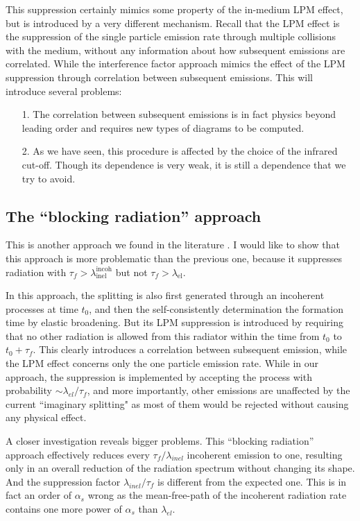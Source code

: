 This suppression certainly mimics some property of the in-medium LPM effect, but is introduced by a very different mechanism.
Recall that the LPM effect is the suppression of the single particle emission rate through multiple collisions with the medium, without any information about how subsequent emissions are correlated. 
While the interference factor approach mimics the effect of the LPM suppression through correlation between subsequent emissions.
This will introduce several problems: 
\begin{itemize}
\item[1.] The correlation between subsequent emissions is in fact physics beyond leading order and requires new types of diagrams to be computed.
\item[2.] As we have seen, this procedure is affected by the choice of the infrared cut-off. Though its dependence is very weak, it is still a dependence that we try to avoid.
\end{itemize}

\subsection{The ``blocking radiation'' approach}
This is another approach we found in the literature \cite{ColemanSmith:2012vr}.
I would like to show that this approach is more problematic than the previous one, because it suppresses radiation with $\tau_f > \lambda_{\textrm{inel}}^{\textrm{incoh}}$ but not $\tau_f > \lambda_{\textrm{el}}$.

In this approach, the splitting is also first generated through an incoherent processes at time $t_0$, and then the self-consistently determination the formation time by elastic broadening. 
But its LPM suppression is introduced by requiring that no other radiation is allowed from this radiator within the time from $t_0$ to $t_0 + \tau_f$.
This clearly introduces a correlation between subsequent emission, while the LPM effect concerns only the one particle emission rate.
While in our approach, the suppression is implemented by accepting the process with probability $\sim \lambda_{el}/\tau_f$, and more importantly, other emissions are unaffected by the current ``imaginary splitting" as most of them would be rejected without causing any physical effect.

A closer investigation reveals bigger problems.
This ``blocking radiation'' approach effectively reduces every $\tau_f/\lambda_{inel}$ incoherent emission to one, resulting only in an overall reduction of the radiation spectrum without changing its shape.
And the suppression factor $\lambda_{inel}/\tau_f$ is different from the expected one.
This is in fact an order of $\alpha_s$ wrong as the mean-free-path of the incoherent radiation rate contains one more power of $\alpha_s$ than $\lambda_{el}$.

